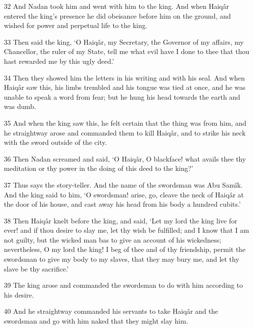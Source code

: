 \par 32 And Nadan took him and went with him to the king. And when Haiqâr entered the king's presence he did obeisance before him on the ground, and wished for power and perpetual life to the king.

\par 33 Then said the king, ‘O Haiqâr, my Secretary, the Governor of my affairs, my Chancellor, the ruler of my State, tell me what evil have I done to thee that thou hast rewarded me by this ugly deed.’

\par 34 Then they showed him the letters in his writing and with his seal. And when Haiqâr saw this, his limbs trembled and his tongue was tied at once, and he was unable to speak a word from fear; but he hung his head towards the earth and was dumb.

\par 35 And when the king saw this, he felt certain that the thing was from him, and he straightway arose and commanded them to kill Haiqâr, and to strike his neck with the sword outside of the city.

\par 36 Then Nadan screamed and said, ‘O Haiqâr, O blackface! what avails thee thy meditation or thy power in the doing of this deed to the king?’

\par 37 Thus says the story-teller. And the name of the swordsman was Abu Samîk. And the king said to him, ‘O swordsman! arise, go, cleave the neck of Haiqâr at the door of his house, and cast away his head from his body a hundred cubits.’

\par 38 Then Haiqâr knelt before the king, and said, ‘Let my lord the king live for ever! and if thou desire to slay me, let thy wish be fulfilled; and I know that I am not guilty, but the wicked man bas to give an account of his wickedness; nevertheless, O my lord the king! I beg of thee and of thy friendship, permit the swordsman to give my body to my slaves, that they may bury me, and let thy slave be thy sacrifice.’

\par 39 The king arose and commanded the swordsman to do with him according to his desire.

\par 40 And he straightway commanded his servants to take Haiqâr and the swordsman and go with him naked that they might slay him.

